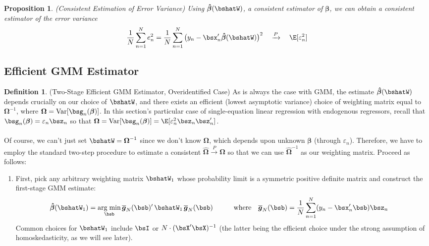 \documentclass[12pt]{article}
\theoremstyle{plain}
\newtheorem{prop}[thm]{Proposition}
\theoremstyle{definition}
\newtheorem{defn}[thm]{Definition}
\theoremstyle{remark}
\newcommand{\bsbeta}{\boldsymbol{\beta}}
\newcommand{\bsOmega}{\boldsymbol{\Omega}}
\newcommand{\bshatbeta}{\boldsymbol{\hat{\beta}}}
\newcommand{\bshatOmega}{\boldsymbol{\hat{\Omega}}}
\newcommand{\bsbarg}{\boldsymbol{\overline{g}}}
\DeclareMathOperator*{\argmin}{arg\;min}
\newcommand{\Var}{\operatorname{Var}}
\newcommand{\pto}{\xrightarrow{P}}
\newcommand{\sumnN}{\sum^N_{n=1}}
\begin{document}
\begin{prop}\emph{(Consistent Estimation of Error Variance)}
Using $\bshatbeta(\bshatW)$, a consistent estimator of $\bsbeta$, we can
obtain a consistent estimator of the error variance
\begin{align*}
  \frac{1}{N} \sumnN e_n^2
  =
  \frac{1}{N} \sumnN \big(y_n - \bsx_n'\bshatbeta(\bshatW)\big)^2
  \quad\pto\quad
  \E[\varepsilon_n^2]
\end{align*}
\end{prop}


\clearpage
\subsection{Efficient GMM Estimator}

\begin{defn}(Two-Stage Efficient GMM Estimator, Overidentified Case)
As is always the case with GMM, the estimate $\bshatbeta(\bshatW)$
depends crucially on our choice of $\bshatW$, and there exists an
efficient (lowest asymptotic variance) choice of weighting matrix equal
to $\bsOmega^{-1}$, where $\bsOmega=\Var[\bsg_n(\bsbeta)]$. In this
section's particular case of single-equation linear regression with
endogenous regressors, recall that $\bsg_n(\bsbeta)=\varepsilon_n\bsz_n$
so that $\bsOmega=\Var[\bsg_n(\bsbeta)]
=\E[\varepsilon^2_n\bsz_n\bsz_n']$.
\\
\\
Of course, we can't just set $\bshatW=\bsOmega^{-1}$ since we don't know
$\bsOmega$, which depends upon unknown $\bsbeta$ (through
$\varepsilon_n$). Therefore, we have to employ the standard two-step
procedure to estimate a consistent $\bshatOmega\pto\bsOmega$ so that we
can use $\bshatOmega^{-1}$ as our weighting matrix. Proceed as follows:
\begin{enumerate}[label=(\roman*)]
  \item First, pick any arbitrary weighting matrix $\bshatW_1$ whose
    probability limit is a symmetric positive definite matrix and
    construct the first-stage GMM estimate:
    \begin{align*}
      \bshatbeta(\bshatW_1) &=
      \argmin_{\bsb}
      \bsbarg_N(\bsb)' \, \bshatW_1 \, \bsbarg_N(\bsb)
      \qquad\quad
      \text{where}\quad
      \bsbarg_N(\bsb)
      = \frac{1}{N} \sumnN (y_n-\bsx_n'\bsb) \bsz_n
    \end{align*}
    Common choices for $\bshatW_1$ include $\bsI$ or $N\cdot
    (\bsX'\bsX)^{-1}$ (the latter being the efficient choice under
    the strong assumption of homoskedasticity, as we will see later).


\end{enumerate}
\end{defn}
\end{document}
